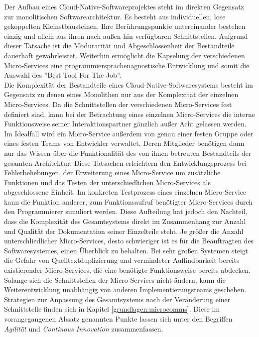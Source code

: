 Der Aufbau eines Cloud-Native-Softwareprojektes steht im direkten Gegensatz zur monolitischen Softwarearchitektur. Es besteht aus individuellen, lose gekoppelten Kleinstbausteinen. Ihre Berührungspunkte untereinander bestehen einzig und allein aus ihren nach außen hin verfügbaren Schnittstellen. Aufgrund dieser Tatsache ist die Modurarität und Abgeschlossenheit der Bestandteile dauerhaft gewährleistet. Weiterhin ermöglicht die Kapselung der verschiedenen Micro-Services eine programmiersprachenagnostische Entwicklung und somit die Auswahl des ''Best Tool For The Job''. \\ 
Die Komplexität der Bestandteile eines Cloud-Native-Softwaresystems besteht im Gegensatz zu denen eines Monolithen nur aus der Komplexität der einzelnen Micro-Services. Da die Schnittstellen der verschiedenen Micro-Services fest definiert sind, kann bei der Betrachtung eines einzelnen Micro-Services die interne Funktionsweise seiner Interaktionspartner gänzlich außer Acht gelassen werden. Im Idealfall wird ein Micro-Service außerdem von genau einer festen Gruppe oder eines festen Teams von Entwickler verwaltet. Deren Mitglieder benötigen dann nur das Wissen über die Funktionalität des von ihnen betreuten Bestandteils der gesamten Architektur. Diese Tatsachen erleichtern den Entwicklungsprozess bei Fehlerbehebungen, der Erweiterung eines Micro-Service um zusätzliche Funktionen und das Testen der unterschiedlichen Micro-Services als abgeschlossene Einheit. Im konkreten Testprozess eines einzelnen Micro-Service kann die Funktion anderer, zum Funktionsaufruf benötigter Micro-Services durch den Programmierer simuliert werden. Diese Aufteilung hat jedoch den Nachteil, dass die Komplexität des Gesamtsystems direkt im Zusammenhang zur Anzahl und Qualität der Dokumentation seiner Einzelteile steht. Je größer die Anzahl unterschliedlicher Micro-Services, desto schwieriger ist es für die Beauftragten des Softwaresystemes, einen Überblick zu behalten. Bei sehr großen Systemen steigt die Gefahr von Quelltextduplizierung und vermindeter Auffindbarkeit bereits existierender Micro-Services, die eine benötigte Funktionsweise bereits abdecken. \\
Solange sich die Schnittstellen der Micro-Services nicht ändern, kann die Weiterentwicklung unabhängig von anderen Implementierungsteams geschehen. Strategien zur Anpassung des Gesamtsystems nach der Veränderung einer Schnittstelle finden sich in Kapitel \ref{grundlagen:microcomms}. Diese im vorangegangenen Absatz genannten Punkte lassen sich unter den Begriffen \textit{Agilität} und \textit{Continous Innovation} zusammenfassen. \\ 
